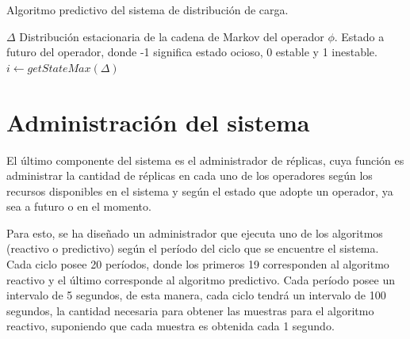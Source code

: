 \begin{algorithm}[!ht]
	\caption{Algoritmo predictivo del sistema de distribución de carga.}
	\label{alg:predictive}
	\begin{algorithmic}[1]
	\REQUIRE$\Delta$ Distribución estacionaria de la cadena de Markov del operador $\phi$.
	\ENSURE Estado a futuro del operador, donde -1 significa estado ocioso, 0 estable y 1 inestable.
		\STATE $i \leftarrow getStateMax(\Delta)$ 
		\ELSE
		\ENDIF
	\ENDIF
	
	
	\end{algorithmic}
\end{algorithm}

\section{Administración del sistema}

El último componente del sistema es el administrador de réplicas, cuya función es administrar la cantidad de réplicas en cada uno de los operadores según los recursos disponibles en el sistema y según el estado que adopte un operador, ya sea a futuro o en el momento.

Para esto, se ha diseñado un administrador que ejecuta uno de los algoritmos (reactivo o predictivo) según el período del ciclo que se encuentre el sistema. Cada ciclo posee 20 períodos, donde los primeros 19 corresponden al algoritmo reactivo y el último corresponde al algoritmo predictivo. Cada período posee un intervalo de 5 segundos, de esta manera, cada ciclo tendrá un intervalo de 100 segundos, la cantidad necesaria para obtener las muestras para el algoritmo reactivo, suponiendo que cada muestra es obtenida cada 1 segundo.

